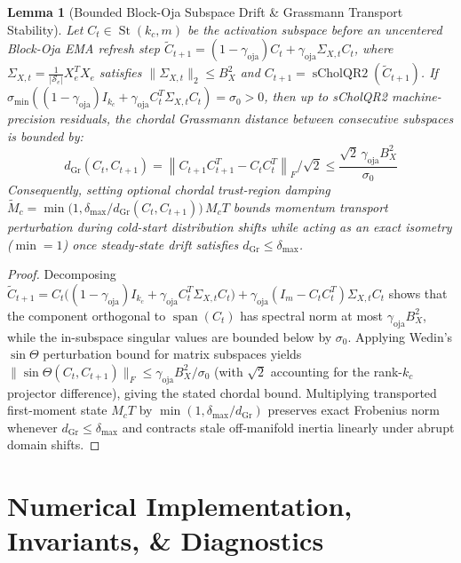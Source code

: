 \documentclass[10pt,twocolumn,letterpaper]{article}
\newtheorem{lemma}{Lemma}
\begin{document}
\begin{lemma}[Bounded Block-Oja Subspace Drift \& Grassmann Transport Stability]
\label{lem:block_oja_drift}
Let $C_t \in \operatorname{St}(k_c, m)$ be the activation subspace before an uncentered Block-Oja EMA refresh step $\tilde{C}_{t+1} = (1 - \gamma_{\text{oja}}) C_t + \gamma_{\text{oja}} \Sigma_{X,t} C_t$, where $\Sigma_{X,t} = \frac{1}{|\mathcal{S}_e|} X_e^T X_e$ satisfies $\|\Sigma_{X,t}\|_2 \le B_X^2$ and $C_{t+1} = \operatorname{sCholQR2}(\tilde{C}_{t+1})$. If $\sigma_{\min}((1 - \gamma_{\text{oja}}) I_{k_c} + \gamma_{\text{oja}} C_t^T \Sigma_{X,t} C_t) = \sigma_0 > 0$, then up to sCholQR2 machine-precision residuals, the chordal Grassmann distance between consecutive subspaces is bounded by:
\begin{equation}
    d_{\text{Gr}}(C_t, C_{t+1}) = \left\| C_{t+1} C_{t+1}^T - C_t C_t^T \right\|_F / \sqrt{2} \le \frac{\sqrt{2}\,\gamma_{\text{oja}} B_X^2}{\sigma_0}
\end{equation}
Consequently, setting optional chordal trust-region damping $\tilde{M}_c = \min\!\big(1, \delta_{\max} / d_{\text{Gr}}(C_t, C_{t+1})\big)\, M_c T$ bounds momentum transport perturbation during cold-start distribution shifts while acting as an exact isometry ($\min=1$) once steady-state drift satisfies $d_{\text{Gr}} \le \delta_{\max}$.
\end{lemma}
\begin{proof}
Decomposing $\tilde{C}_{t+1} = C_t \big((1-\gamma_{\text{oja}})I_{k_c} + \gamma_{\text{oja}} C_t^T \Sigma_{X,t} C_t\big) + \gamma_{\text{oja}}(I_m - C_t C_t^T)\Sigma_{X,t} C_t$ shows that the component orthogonal to $\operatorname{span}(C_t)$ has spectral norm at most $\gamma_{\text{oja}} B_X^2$, while the in-subspace singular values are bounded below by $\sigma_0$. Applying Wedin's $\sin\Theta$ perturbation bound for matrix subspaces yields $\|\sin\Theta(C_t, C_{t+1})\|_F \le \gamma_{\text{oja}} B_X^2 / \sigma_0$ (with $\sqrt{2}$ accounting for the rank-$k_c$ projector difference), giving the stated chordal bound. Multiplying transported first-moment state $M_c T$ by $\min(1, \delta_{\max}/d_{\text{Gr}})$ preserves exact Frobenius norm whenever $d_{\text{Gr}} \le \delta_{\max}$ and contracts stale off-manifold inertia linearly under abrupt domain shifts.
\end{proof}

\section{Numerical Implementation, Invariants, \& Diagnostics}
\end{document}
